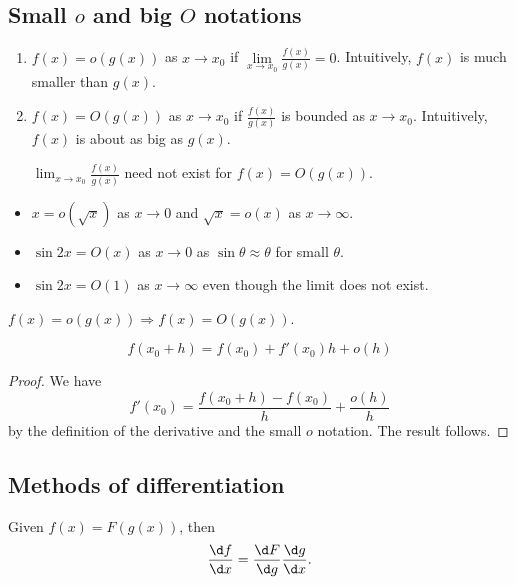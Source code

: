 \documentclass[a4paper]{article}
\begin{document}
\subsection{Small \texorpdfstring{$o$}{o} and big \texorpdfstring{$O$}{O} notations}
\begin{defi}\leavevmode
  \begin{enumerate}
  \item $f(x) = o(g(x))$ as $x\to x_0$ if $\lim\limits_{x\to x_0} \frac{f(x)}{g(x)} = 0$. Intuitively, $f(x)$ is much smaller than $g(x)$.
  \item $f(x) = O(g(x))$ as $x\to x_0$ if $\frac{f(x)}{g(x)}$ is bounded as $x\to x_0$. Intuitively, $f(x)$ is about as big as $g(x)$.

\note $\displaystyle \lim_{x\to x_0} \frac{f(x)}{g(x)}$ need not exist for $f(x)=O(g(x))$.
  \end{enumerate}
\end{defi}

\begin{eg}\leavevmode
  \begin{itemize}
  \item $x=o(\sqrt{x})$ as $x\to 0$ and $\sqrt{x} = o(x)$ as $x\to \infty$.
  \item $\sin 2x = O(x)$ as $x\to 0$ as $\sin \theta \approx \theta$ for small $\theta$.
  \item $\sin 2x = O(1)$ as $x\to \infty$ even though the limit does not exist.
  \end{itemize}
\end{eg}
\note $f(x)=o(g(x))\Rightarrow f(x) = O(g(x))$.

\begin{prop}
  \[
  f(x_0 + h) = f(x_0) + f'(x_0)h + o(h)
  \]
\end{prop}

\begin{proof}
We have
  \[
  f'(x_0) = \frac{f(x_0 + h) - f(x_0)}{h} + \frac{o(h)}{h}
  \]
by the definition of the derivative and the small $o$ notation. The result follows.
\end{proof}

\subsection{Methods of differentiation}
\begin{thm}
  Given $f(x) = F(g(x))$, then
  \[
  \frac{\d f}{\d x} = \frac{\d F}{\d g}\frac{\d g}{\d x}.
  \]
\end{thm}
\end{document}
